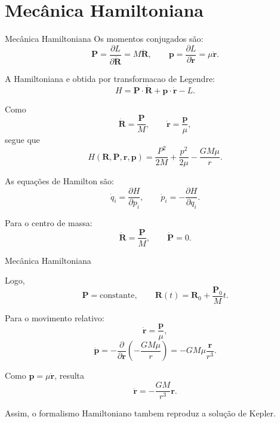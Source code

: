 \documentclass[10pt]{beamer}
\begin{document}
\section{Mecânica Hamiltoniana}
\begin{frame}{Mecânica Hamiltoniana}
    Os momentos conjugados são:
\begin{equation}
\bm P=\frac{\partial L}{\partial \dot{\bm R}}=M\dot{\bm R},
\qquad
\bm p=\frac{\partial L}{\partial \dot{\bm r}}=\mu\dot{\bm r}.
\end{equation}

A Hamiltoniana e obtida por transformacao de Legendre:
\begin{equation}
H=\bm P\cdot\dot{\bm R}+\bm p\cdot\dot{\bm r}-L.
\end{equation}

Como
\begin{equation}
\dot{\bm R}=\frac{\bm P}{M},
\qquad
\dot{\bm r}=\frac{\bm p}{\mu},
\end{equation}
segue que
\begin{equation}
\boxed{
H(\bm R,\bm P,\bm r,\bm p)
=\frac{P^2}{2M}+\frac{p^2}{2\mu}-\frac{GM\mu}{r}
}.
\end{equation}

As equações de Hamilton são:
\begin{equation}
\dot q_i=\frac{\partial H}{\partial p_i},
\qquad
\dot p_i=-\frac{\partial H}{\partial q_i}.
\end{equation}

Para o centro de massa:
\begin{equation}
\dot{\bm R}=\frac{\bm P}{M},
\qquad
\dot{\bm P}=0.
\end{equation}
\end{frame}

\begin{frame}{Mecânica Hamiltoniana}
    
Logo,
\begin{equation}
\bm P=\text{constante},
\qquad
\bm R(t)=\bm R_0+\frac{\bm P_0}{M}t.
\end{equation}

Para o movimento relativo:
\begin{equation}
\dot{\bm r}=\frac{\bm p}{\mu},
\end{equation}
\begin{equation}
\dot{\bm p}
=-\frac{\partial}{\partial \bm r}
\left(-\frac{GM\mu}{r}\right)
=-GM\mu\frac{\bm r}{r^3}.
\end{equation}

Como $\bm p=\mu\dot{\bm r}$, resulta
\begin{equation}
\boxed{
\ddot{\bm r}=-\frac{GM}{r^3}\bm r
}.
\end{equation}

Assim, o formalismo Hamiltoniano tambem reproduz a solução de Kepler.

\end{frame}
\end{document}

